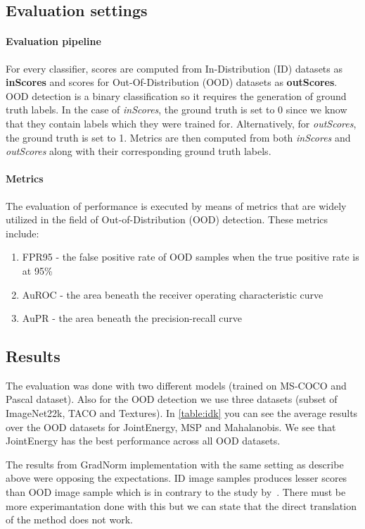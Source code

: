 \subsection{Evaluation settings}
\paragraph{Evaluation pipeline}
For every classifier, scores are computed from In-Distribution (ID) datasets as \textbf{inScores} 
and scores for Out-Of-Distribution (OOD) datasets as \textbf{outScores}. 
OOD detection is a binary classification so it requires the generation of ground truth labels. 
In the case of \textit{inScores}, the ground truth is set to 0 since we know that they contain labels which they were trained for. 
Alternatively, for \textit{outScores}, the ground truth is set to 1. 
Metrics are then computed from both \textit{inScores} and \textit{outScores} along with their corresponding ground truth labels.

\paragraph{Metrics}
The evaluation of performance is executed by means of metrics that are widely utilized in the field of Out-of-Distribution (OOD) detection. 
These metrics include:

\begin{enumerate}[label=(\alph*)]
\item FPR95 - the false positive rate of OOD samples when the true positive rate is at 95\%
\item AuROC - the area beneath the receiver operating characteristic curve
\item AuPR - the area beneath the precision-recall curve
\end{enumerate}

\subsection{Results}
The evaluation was done with two different models (trained on MS-COCO and Pascal dataset). 
Also for the OOD detection we use three datasets (subset of ImageNet22k, TACO and Textures).
In \autoref{table:idk} you can see the average results over the OOD datasets for JointEnergy, MSP and Mahalanobis. 
We see that JointEnergy has the best performance across all OOD datasets.

The results from GradNorm implementation with the same setting as describe above were opposing the expectations. 
ID image samples produces lesser scores than OOD image sample which is in contrary to the study by~\cite{huangImportanceGradientsDetecting2021}.
There must be more experimantation done with this but we can state that the direct translation of the method does not work. 



